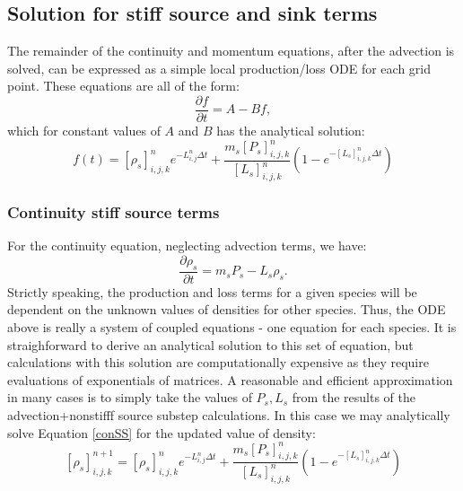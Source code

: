 \documentclass[11pt,letterpaper]{article}
\begin{document}
\subsection{Solution for stiff source and sink terms}

The remainder of the continuity and momentum equations, after the advection is solved, can be expressed as a simple local production/loss ODE for each grid point.  These equations are all of the form:
\begin{equation}
\frac{\partial f}{\partial t} = A - B f, 
\end{equation}
which for constant values of $A$ and $B$ has the analytical solution:
\begin{equation}
f(t) = \left[ \rho_s \right]_{i,j,k}^n e^{-L_{i,j}^n \Delta t} + \frac{m_s \left[ P_s \right]_{i,j,k}^n}{\left[ L_s \right]_{i,j,k}^n} \left( 1 - e^{-\left[ L_s \right]_{i,j,k}^n \Delta t} \right) \label{conSSsoln}
\end{equation}

\subsubsection{Continuity stiff source terms}

For the continuity equation, neglecting advection terms, we have:
\begin{equation}
\frac{\partial \rho_s }{\partial t} = m_s P_s - L_s \rho_s. \label{conSS}
\end{equation}
Strictly speaking, the production and loss terms for a given species will be dependent on the unknown values of densities for other species.  Thus, the ODE above is really a system of coupled equations - one equation for each species.  It is straighforward to derive an analytical solution to this set of equation, but calculations with this solution are computationally expensive as they require evaluations of exponentials of matrices.  A reasonable and efficient approximation in many cases is to simply take the values of $P_s,L_s$ from the results of the advection+nonstifff source substep calculations.  In this case we may analytically solve Equation \ref{conSS} for the updated value of density:  
\begin{equation}
\left[ \rho_s \right]_{i,j,k}^{n+1} = \left[ \rho_s \right]_{i,j,k}^n e^{-L_{i,j}^n \Delta t} + \frac{m_s \left[ P_s \right]_{i,j,k}^n}{\left[ L_s \right]_{i,j,k}^n} \left( 1 - e^{-\left[ L_s \right]_{i,j,k}^n \Delta t} \right) \label{conSSsoln}
\end{equation}
\end{document}

